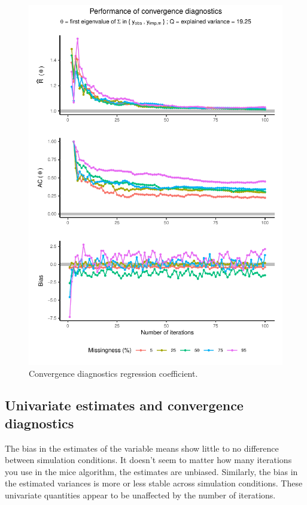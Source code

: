 \documentclass[Royal,times,sageh]{sagej}
\begin{document}
\begin{figure}

{\centering \includegraphics{manuscript_files/figure-latex/pred-1} 

}

\caption{Convergence diagnostics regression coefficient.}\label{fig:pred}
\end{figure}

\hypertarget{univariate-estimates-and-convergence-diagnostics}{%
\subsection{Univariate estimates and convergence
diagnostics}\label{univariate-estimates-and-convergence-diagnostics}}

The bias in the estimates of the variable means show little to no
difference between simulation conditions. It doesn't seem to matter how
many iterations you use in the mice algorithm, the estimates are
unbiased. Similarly, the bias in the estimated variances is more or less
stable across simulation conditions. These univariate quantities appear
to be unaffected by the number of iterations.
\end{document}

